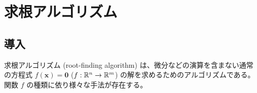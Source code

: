 %

\part{求根アルゴリズム}

\chapter{導入}

求根アルゴリズム (root-finding algorithm)
は、微分などの演算を含まない通常の方程式
$f(\bm{x})=\bm{0}$ ($f : \mathbb{R}^n \to \mathbb{R}^m$)
の解を求めるためのアルゴリズムである。
関数 $f$ の種類に依り様々な手法が存在する。


